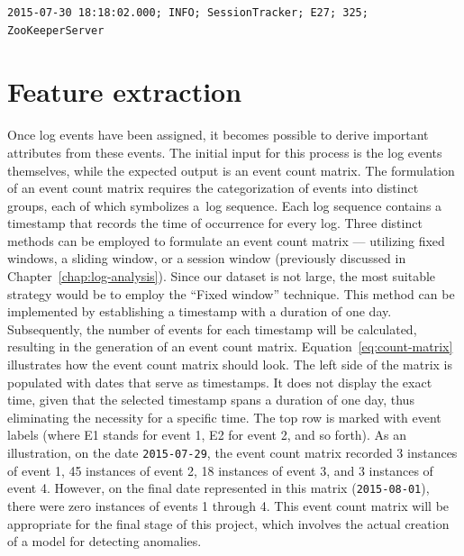 \begin{lstlisting}
2015-07-30 18:18:02.000; INFO; SessionTracker; E27; 325; ZooKeeperServer
\end{lstlisting}


\section{Feature extraction}
\label{sec:feature}
Once log events have been assigned, it becomes possible to derive important attributes from these events. The initial input for this process is the log events themselves, while the expected output is an event count matrix. The formulation of an event count matrix requires the categorization of events into distinct groups, each of which symbolizes a~log sequence. Each log sequence contains a timestamp that records the time of occurrence for every log. Three distinct methods can be employed to formulate an event count matrix --- utilizing fixed windows, a sliding window, or a session window (previously discussed in Chapter~\ref{chap:log-analysis}). Since our dataset is not large, the most suitable strategy would be to employ the ``Fixed window'' technique. This method can be implemented by establishing a timestamp with a duration of one day. Subsequently, the number of events for each timestamp will be calculated, resulting in the generation of an event count matrix. Equation~\ref{eq:count-matrix} illustrates how the event count matrix should look. The left side of the matrix is populated with dates that serve as timestamps. It does not display the exact time, given that the selected timestamp spans a duration of one day, thus eliminating the necessity for a specific time. The top row is marked with event labels (where E1 stands for event 1, E2 for event 2, and so forth). As an illustration, on the date \texttt{2015-07-29}, the event count matrix recorded 3 instances of event 1, 45 instances of event 2, 18 instances of event 3, and 3 instances of event 4. However, on the final date represented in this matrix (\texttt{2015-08-01}), there were zero instances of events 1 through 4. This event count matrix will be appropriate for the final stage of this project, which involves the actual creation of a model for detecting anomalies.


